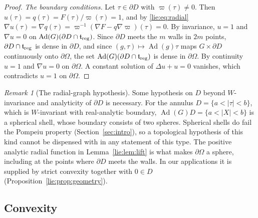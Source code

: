 \documentclass[11pt]{amsart}
\theoremstyle{definition}
\theoremstyle{remark}
\newtheorem{remark}[theorem]{Remark}
\numberwithin{equation}{section}
\newcommand{\Ad}{\operatorname{Ad}}
\newcommand{\tf}{\mathfrak{t}}
\begin{document}
\begin{proof}
\emph{The boundary conditions.} Let $\tau\in\partial D$ with $\varpi(\tau)\neq0$. Then $u(\tau)=q(\tau)=F(\tau)/\varpi(\tau)=1$, and by \eqref{lie:eq:radial} $\nabla u(\tau)=\nabla q(\tau)=\varpi^{-1}(\nabla F-q\nabla\varpi)(\tau)=0$. By invariance, $u=1$ and $\nabla u=0$ on $\Ad(G)(\partial D\cap\tf_{\rm reg})$. Since $\partial D$ meets the $m$ walls in $2m$ points, $\partial D\cap\tf_{\rm reg}$ is dense in $\partial D$, and since $(g,\tau)\mapsto\Ad(g)\tau$ maps $G\times\partial D$ continuously onto $\partial\Omega$, the set $\Ad(G)(\partial D\cap\tf_{\rm reg})$ is dense in $\partial\Omega$. By continuity $u=1$ and $\nabla u=0$ on $\partial\Omega$. A constant solution of $\Delta u+u=0$ vanishes, which contradicts $u=1$ on $\partial\Omega$.
\end{proof}

\begin{remark}[The radial-graph hypothesis]\label{lie:rem:annulus}
Some hypothesis on $D$ beyond $W$-invariance and analyticity of $\partial D$ is necessary. For the annulus $D=\{a<|\tau|<b\}$, which is $W$-invariant with real-analytic boundary, $\Ad(G)D=\{a<|X|<b\}$ is a spherical shell, whose boundary consists of two spheres. Spherical shells do fail the Pompeiu property (Section~\ref{sec:intro}), so a topological hypothesis of this kind cannot be dispensed with in any statement of this type. The positive analytic radial function in Lemma~\ref{lie:lem:lift} is what makes $\partial\Omega$ a sphere, including at the points where $\partial D$ meets the walls. In our applications it is supplied by strict convexity together with $0\in D$ (Proposition~\ref{lie:prop:geometry}).
\end{remark}

\subsection{Convexity}\label{lie:subsec:convex}
\end{document}
